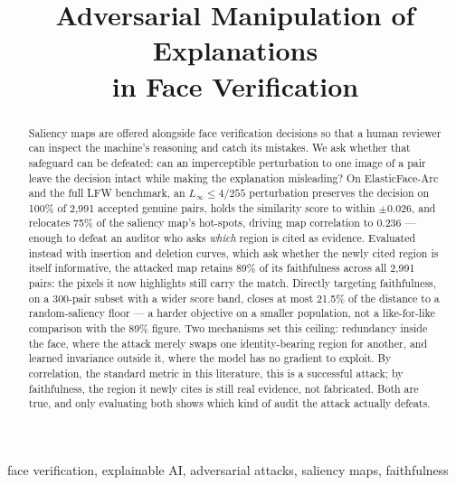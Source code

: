 \documentclass[conference,10pt]{IEEEtran}
\newcommand{\Linf}{L_\infty}
\begin{document}
\title{Adversarial Manipulation of Explanations\\ in Face Verification}

\author{
  }

\maketitle

\begin{abstract}
Saliency maps are offered alongside face verification decisions so that a human reviewer can
inspect the machine's reasoning and catch its mistakes. We ask whether that safeguard can be
defeated: can an imperceptible perturbation to one image of a pair leave the decision intact
while making the explanation misleading? On ElasticFace-Arc and the full LFW benchmark, an
$\Linf \le 4/255$ perturbation preserves the decision on 100\% of 2{,}991 accepted genuine
pairs, holds the similarity score to within $\pm 0.026$, and relocates 75\% of the saliency
map's hot-spots, driving map correlation to 0.236 — enough to defeat an auditor who asks
\emph{which} region is cited as evidence. Evaluated instead with insertion and deletion curves,
which ask whether the newly cited region is itself informative, the attacked map retains 89\%
of its faithfulness across all 2{,}991 pairs: the pixels it now highlights still carry the
match. Directly targeting faithfulness, on a 300-pair subset with a wider score band, closes at
most 21.5\% of the distance to a random-saliency floor — a harder objective on a smaller
population, not a like-for-like comparison with the 89\% figure. Two mechanisms set this
ceiling: redundancy inside the face, where the attack merely swaps one identity-bearing region
for another, and learned invariance outside it, where the model has no gradient to exploit. By
correlation, the standard metric in this literature, this is a successful attack; by
faithfulness, the region it newly cites is still real evidence, not fabricated. Both are true,
and only evaluating both shows which kind of audit the attack actually defeats.
\end{abstract}

\begin{IEEEkeywords}
face verification, explainable AI, adversarial attacks, saliency maps, faithfulness
\end{IEEEkeywords}

\end{document}
